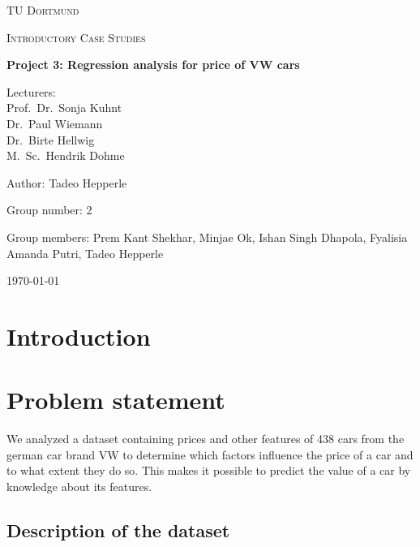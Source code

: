 \documentclass[12 pt]{scrartcl}
\begin{document}
\begin{titlepage}
  \centering
  {\scshape\LARGE TU Dortmund \par}
  \vspace{1cm}
  {\scshape\Large Introductory Case Studies \par}
  \vspace{2cm}
  {\huge\bfseries Project 3: Regression analysis for price of VW cars\par}
  \vspace{2cm}
  {\Large Lecturers:\\
    Prof.\ Dr.\ Sonja Kuhnt\\
    Dr.\ Paul Wiemann\\
    Dr.\ Birte Hellwig\\
    M.\ Sc.\ Hendrik Dohme \par}
  \vspace{1cm}
  {\Large Author: Tadeo Hepperle \par}
  \vspace{0.5 cm}
  {\Large Group number: 2\par}
  \vspace{0.5 cm}
  {\Large Group members: Prem Kant Shekhar, Minjae Ok, Ishan Singh Dhapola, Fyalisia Amanda Putri, Tadeo Hepperle}
  \vfill
  {\large \today\par}
\end{titlepage}


\tableofcontents

\cleardoublepage

\section{Introduction}


\section{Problem statement}

We analyzed a dataset containing prices and other features of 438 cars from the german car brand VW to determine which factors influence the price of a car and to what extent they do so. This makes it possible to predict the value of a car by knowledge about its features.

\subsection{Description of the dataset}
\end{document}
